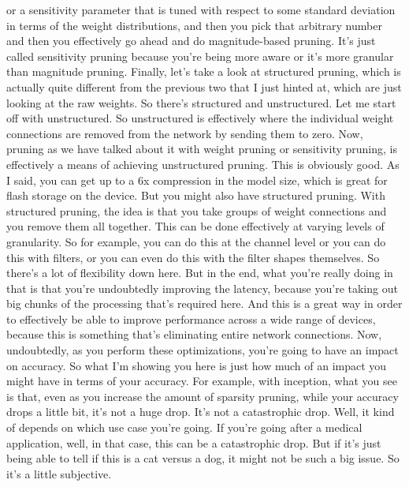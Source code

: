 {{{{{    or a sensitivity parameter that is tuned with respect
    to some standard deviation in terms of the weight distributions,
    and then you pick that arbitrary number and then
    you effectively go ahead and do magnitude-based pruning.
    It's just called sensitivity pruning because you're being more aware
    or it's more granular than magnitude pruning.
    Finally, let's take a look at structured pruning,
    which is actually quite different from the previous two
    that I just hinted at, which are just looking at the raw weights.
    So there's structured and unstructured.
    Let me start off with unstructured.
    So unstructured is effectively where the individual weight connections
    are removed from the network by sending them to zero.
    Now, pruning as we have talked about it with weight pruning or sensitivity
    pruning, is effectively a means of achieving unstructured pruning.
    This is obviously good.
    As I said, you can get up to a 6x compression in the model size, which is
    great for flash storage on the device.
    But you might also have structured pruning.
    With structured pruning, the idea is that you
    take groups of weight connections and you remove them all together.
    This can be done effectively at varying levels of granularity.
    So for example, you can do this at the channel level
    or you can do this with filters, or you can even do this with the filter
    shapes themselves.
    So there's a lot of flexibility down here.
    But in the end, what you're really doing in that is that you're undoubtedly
    improving the latency, because you're taking out big chunks of the processing
    that's required here.
    And this is a great way in order to effectively
    be able to improve performance across a wide range of devices,
    because this is something that's eliminating entire network connections.
    Now, undoubtedly, as you perform these optimizations,
    you're going to have an impact on accuracy.
    So what I'm showing you here is just how much of an impact
    you might have in terms of your accuracy.
    For example, with inception, what you see
    is that, even as you increase the amount of sparsity pruning,
    while your accuracy drops a little bit, it's not a huge drop.
    It's not a catastrophic drop.
    Well, it kind of depends on which use case you're going.
    If you're going after a medical application, well, in that case,
    this can be a catastrophic drop.
    But if it's just being able to tell if this is a cat versus a dog,
    it might not be such a big issue.
    So it's a little subjective.
}}}}}
